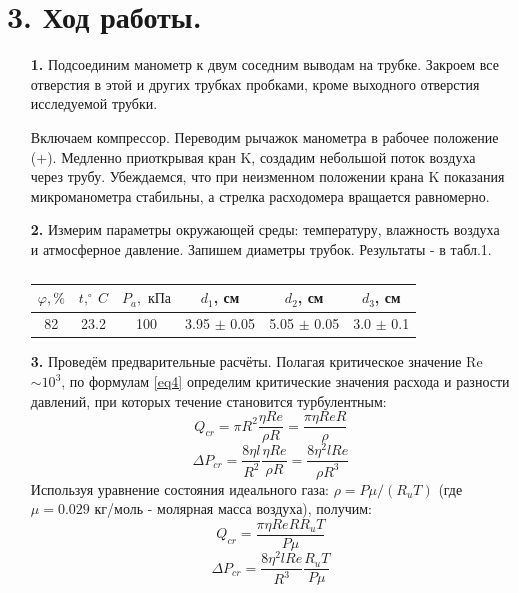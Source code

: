 \documentclass[a4paper]{article}
\begin{document}
\section*{3. Ход работы.}
\begin{itemize}
\item[\textbf{1. }] Подсоединим манометр к двум соседним выводам на трубке. Закроем все отверстия в этой и других трубках пробками, кроме выходного отверстия исследуемой трубки.

\noindent
Включаем компрессор. Переводим рычажок манометра в рабочее положение (+). Медленно приоткрывая кран K, создадим небольшой поток воздуха через трубу. Убеждаемся, что при неизменном положении крана K показания микроманометра стабильны, а стрелка расходомера вращается равномерно.

\item[\textbf{2. }] Измерим параметры окружающей среды: температуру, влажность воздуха и атмосферное давление. Запишем диаметры трубок. Результаты - в табл.1.

\begin{table}[h!]
\centering
\begin{tabular}{|c|c|c|c|c|c|}
\hline
$\varphi,   \%$ & $t, ^{\circ} \ C$ & $P_a, \text{ кПа}$ & $d_1$, см       & $d_2$, см       & $d_3$, см     \\ \hline
82              & 23.2              & 100               & 3.95 $\pm$ 0.05 & 5.05 $\pm$ 0.05 & 3.0 $\pm$ 0.1 \\ \hline
\end{tabular}
\caption{}
\end{table}
\item[\textbf{3. }] Проведём предварительные расчёты. Полагая критическое значение Re $\sim 10^{3}$, по формулам \eqref{eq4} определим критические значения расхода и разности давлений, при которых течение становится турбулентным:
\[Q_{cr} = \pi R^2 \frac{\eta Re}{\rho R} = \frac{\pi \eta Re R}{\rho}  \]
\[\Delta P_{cr} = \frac{8 \eta l}{R^2} \frac{\eta Re}{\rho R} = \frac{8 \eta^2 l Re}{\rho R^3} \]
Используя уравнение состояния идеального газа: $\rho = P \mu/(R_u T)$ (где $\mu = 0.029$ кг/моль - молярная масса воздуха), получим:
\begin{equation}\label{eq6}
Q_{cr} = \frac{\pi \eta Re R R_u T}{P \mu} 
\end{equation}
\begin{equation}\label{eq7}
\Delta P_{cr} = \frac{8 \eta^2 l Re}{R^3} \frac{R_u T}{P \mu}
\end{equation}


\end{itemize}
\end{document}
